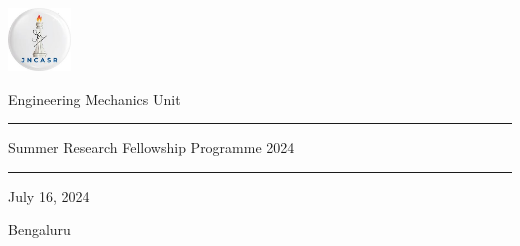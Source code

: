 \begin{titlepage}
	\thispagestyle{empty} %
	
	\noindent
	\begin{minipage}{0.1\textwidth}
		\includegraphics[height=4.5em]{Pictures/JNCASR_Logo.png}
	\end{minipage}
	\hfill
	\begin{minipage}{0.5\textwidth}
		\begin{center}
			\renewcommand\familydefault{\sfdefault}
			\selectfont
			{\large Engineering Mechanics Unit}
		\end{center}
	\end{minipage}
	
    \begin{center}
%        
        
        
        
            \noindent\textcolor{myred}{\rule{\linewidth}{4.8pt}}
        
        \vspace{3em}
        
        \vspace{3em}
        \vfill
        \noindent \Large{{Summer Research Fellowship Programme 2024}}
        
        \vspace{0.5em}
        \noindent\textcolor{myred}{\rule{\linewidth}{4.8pt}}
        
        \vspace{2em}
        {\Large July 16, 2024}
        
        {\Large Bengaluru}
        
        
        
    \end{center}
\end{titlepage}
